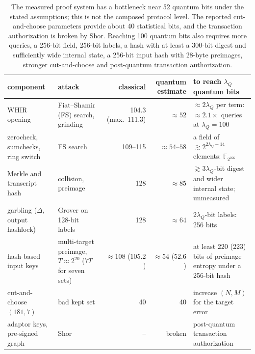 \documentclass[11pt]{article}
\begin{document}
\begin{table}[t]\centering\footnotesize\setlength{\tabcolsep}{4pt}
\begin{tabularx}{\textwidth}{>{\raggedright\arraybackslash}p{2.6cm}>{\raggedright\arraybackslash}p{2.4cm}rr>{\raggedright\arraybackslash}X}\toprule
component & attack & classical & quantum estimate & to reach $\lambda_Q$ quantum bits\\\midrule
WHIR opening & Fiat--Shamir (FS) search, grinding & 104.3 (max.\ 111.3) & $\approx52$ & $\approx2\lambda_Q$ per term: $\approx2.1\times$ queries at $\lambda_Q=100$\\
zerocheck, sumchecks, ring switch & FS search & 109--115 & $\approx54$--$58$ & a field of $\gtrsim2^{2\lambda_Q+14}$ elements: $\mathbb{F}_{2^{256}}$\\
Merkle and transcript hash & collision, preimage & 128 & $\approx85$ & $\gtrsim3\lambda_Q$-bit digest and wider internal state; unmeasured\\
garbling ($\Delta$, output hashlock) & Grover on 128-bit labels & 128 & $\approx64$ & $2\lambda_Q$-bit labels: 256 bits\\
hash-based input keys & multi-target preimage, $T\approx2^{20}$ ($7T$ for seven sets) & $\approx108$ ($105.2$) & $\approx54$ ($52.6$) & at least 220 (223) bits of preimage entropy under a 256-bit hash\\
cut-and-choose $(181,7)$ & bad kept set & 40 & 40 & increase $(N,M)$ for the target error\\
adaptor keys, pre-signed graph & Shor & -- & broken & post-quantum transaction authorization\\\bottomrule
\end{tabularx}
\caption{The measured proof system has a bottleneck near 52 quantum bits under
the stated assumptions; this is not the composed protocol level. The reported
cut-and-choose parameters provide about 40 statistical bits, and the transaction
authorization is broken by Shor. Reaching 100 quantum bits also requires more
queries, a 256-bit field, 256-bit labels, a hash with at least a 300-bit digest
and sufficiently wide internal state, a 256-bit input hash with 28-byte
preimages, stronger cut-and-choose and
post-quantum transaction authorization.}
\label{tab:pq}
\end{table}
\end{document}

